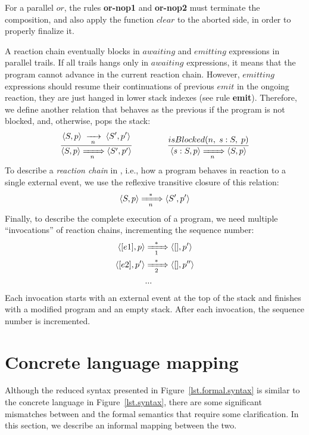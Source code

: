 For a parallel $or$, the rules \textbf{or-nop1} and \textbf{or-nop2} must 
terminate the composition, and also apply the function $clear$ to the aborted 
side, in order to properly finalize it.

A reaction chain eventually blocks in $awaiting$ and $emitting$ expressions in 
parallel trails.
%
If all trails hangs only in $awaiting$ expressions, it means that the program 
cannot advance in the current reaction chain.
%
However, $emitting$ expressions should resume their continuations of previous 
$emit$ in the ongoing reaction, they are just hanged in lower stack indexes 
(see rule \textbf{emit}).
%
Therefore, we define another relation that behaves as the previous if the 
program is not blocked, and, otherwise, pops the stack:
%
$$
\frac
    { \DS \LL S,p \RR \ST                   \LL S',p' \RR }
    {     \LL S,p \RR \xRightarrow[~~n~~]{} \LL S',p' \RR }
%
\5\5\5
%
\frac
    { \DS isBlocked(n,\1s:S,\1p) }
    { \LL s:S,p \RR \xRightarrow[~~n~~]{} \LL S,p \RR }
$$
%
To describe a \emph{reaction chain} in \CEU, i.e., how a program behaves in 
reaction to a single external event, we use the reflexive transitive closure of 
this relation:
%
$$
    \langle S,p \rangle \xRightarrow[~~n~~]{*} \langle S',p' \rangle
$$
%
Finally, to describe the complete execution of a program, we need multiple 
``invocations'' of reaction chains, incrementing the sequence number:
%
\begin{align*}
\langle [e1], p \rangle
    & \xRightarrow[~~1~~]{*}
\langle [  ], p' \rangle
\\
\langle [e2], p' \rangle
    & \xRightarrow[~~2~~]{*}
\langle [  ], p'' \rangle
\\
& ...
\end{align*}
%
Each invocation starts with an external event at the top of the stack and 
finishes with a modified program and an empty stack.
After each invocation, the sequence number is incremented.

\section{Concrete language mapping}

Although the reduced syntax presented in Figure~\ref{lst.formal.syntax} is 
similar to the concrete language in Figure~\ref{lst.syntax}, there are some 
significant mismatches between \CEU and the formal semantics that require some 
clarification.
In this section, we describe an informal mapping between the two.


